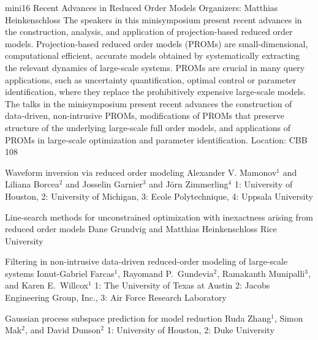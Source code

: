 \mini
{mini16}
{Recent Advances in Reduced Order Models}
{Organizers: Matthias Heinkenschloss}
{The speakers in this minisymposium present recent advances in the construction, analysis, and application of projection-based reduced order models. Projection-based reduced order models (PROMs) are small-dimensional, computational efficient, accurate models obtained by systematically extracting the relevant dynamics of large-scale systems. PROMs are crucial in many query applications, such as uncertainty quantification, optimal control or parameter identification, where they replace the prohibitively expensive large-scale models. The talks in the minisymposium present recent advances the construction of data-driven, non-intrusive PROMs, modifications of PROMs that preserve structure of the underlying large-scale full order models, and applications of PROMs in large-scale optimization and parameter identification.}
{Location: CBB 108}

\begin{talks}
\item\talk
{Waveform inversion via reduced order modeling}
{Alexander V. Mamonov$^{1}$ and Liliana Borcea$^{2}$ and Josselin Garnier$^{3}$ and J\"{o}rn Zimmerling$^{4}$}
{1: University of Houston, 2: University of Michigan, 3: Ecole Polytechnique, 4: Uppsala University}
\item\talk
{Line-search methods for unconstrained optimization with inexactness arising from reduced order models}
{Dane Grundvig and Matthias Heinkenschloss}
{Rice University}
\item\talk
{Filtering in non-intrusive data-driven reduced-order modeling of large-scale systems}
{Ionut-Gabriel Farcas$^{1}$, Rayomand P.~Gundevia$^{2}$, Ramakanth Munipalli$^{3}$, and Karen E.~Willcox$^{1}$}
{1: The University of Texas at Austin 2: Jacobs Engineering Group, Inc., 3: Air Force Research Laboratory}
\item\talk
{Gaussian process subspace prediction for model reduction}
{Ruda Zhang$^{1}$, Simon Mak$^{2}$, and David Dunson$^{2}$}
{1: University of Houston, 2: Duke University}
\end{talks}
\room
